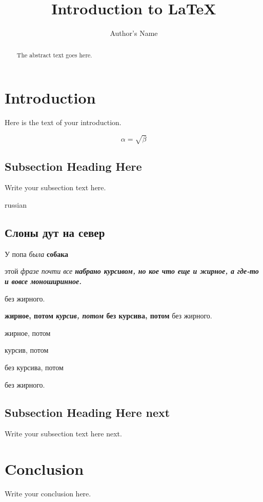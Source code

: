 \documentclass[oneside,final,14pt]{extreport}
\begin{document}
\title{Introduction to \LaTeX{}}
\author{Author's Name}

\maketitle

\begin{abstract}
The abstract text goes here.
\end{abstract}

\section{Introduction}
Here is the text of your introduction.

\begin{equation}
    \label{simple_equation}
    \alpha = \sqrt{ \beta }
\end{equation}

\subsection{Subsection Heading Here}
Write your subsection text here.

\begin{otherlanguage*}{russian}
\subsection{Слоны дут на север}
У попа {\it была} {\bf собака}

 этой \itshape фразе почти все \bfseries 
набрано курсивом, \ttfamily но кое что
\upshape еще и жирное, \rmfamily а где-то
и вовсе \mdseries моноширинное.

 без жирного.

 \textbf{жирное, потом \textit{курсив, потом} без курсива, потом} без жирного.

 \begin{bfseries} жирное, потом 
        \begin{itshape} курсив, потом
        \end{itshape}без курсива, потом
        \end{bfseries} без жирного.


\end{otherlanguage*}

\subsection{Subsection Heading Here next}
Write your subsection text here next.

\section{Conclusion}
Write your conclusion here.
\end{document}
